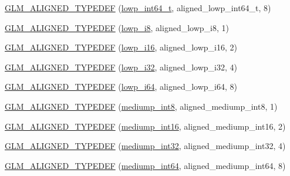\begin{DoxyCompactItemize}
\item 
\hyperlink{group__gtx__type__aligned_ga7ccb60f3215d293fd62b33b31ed0e7be}{G\+L\+M\+\_\+\+A\+L\+I\+G\+N\+E\+D\+\_\+\+T\+Y\+P\+E\+D\+E\+F} (\hyperlink{group__gtc__type__precision_ga14d72e76d57c7f28eca8e933816c9fd6}{lowp\+\_\+int64\+\_\+t}, aligned\+\_\+lowp\+\_\+int64\+\_\+t, 8)
\item 
\hyperlink{group__gtx__type__aligned_gac20d508d2ef5cc95ad3daf083c57ec2a}{G\+L\+M\+\_\+\+A\+L\+I\+G\+N\+E\+D\+\_\+\+T\+Y\+P\+E\+D\+E\+F} (\hyperlink{group__gtc__type__precision_gaa2e13ee29c90f75658beed6082541097}{lowp\+\_\+i8}, aligned\+\_\+lowp\+\_\+i8, 1)
\item 
\hyperlink{group__gtx__type__aligned_ga50257b48069a31d0c8d9c1f644d267de}{G\+L\+M\+\_\+\+A\+L\+I\+G\+N\+E\+D\+\_\+\+T\+Y\+P\+E\+D\+E\+F} (\hyperlink{group__gtc__type__precision_gaf7bbfd31bcec25a416ea94d09efb5451}{lowp\+\_\+i16}, aligned\+\_\+lowp\+\_\+i16, 2)
\item 
\hyperlink{group__gtx__type__aligned_gaa07e98e67b7a3435c0746018c7a2a839}{G\+L\+M\+\_\+\+A\+L\+I\+G\+N\+E\+D\+\_\+\+T\+Y\+P\+E\+D\+E\+F} (\hyperlink{group__gtc__type__precision_ga70fd34e8b8cffc92739161284ed77328}{lowp\+\_\+i32}, aligned\+\_\+lowp\+\_\+i32, 4)
\item 
\hyperlink{group__gtx__type__aligned_ga62601fc6f8ca298b77285bedf03faffd}{G\+L\+M\+\_\+\+A\+L\+I\+G\+N\+E\+D\+\_\+\+T\+Y\+P\+E\+D\+E\+F} (\hyperlink{group__gtc__type__precision_ga1f4ded25f71c0f3b4518936d50b54b6e}{lowp\+\_\+i64}, aligned\+\_\+lowp\+\_\+i64, 8)
\item 
\hyperlink{group__gtx__type__aligned_gac8cff825951aeb54dd846037113c72db}{G\+L\+M\+\_\+\+A\+L\+I\+G\+N\+E\+D\+\_\+\+T\+Y\+P\+E\+D\+E\+F} (\hyperlink{group__gtc__type__precision_ga3ee8faab2278c44c5785af04b7b18a14}{mediump\+\_\+int8}, aligned\+\_\+mediump\+\_\+int8, 1)
\item 
\hyperlink{group__gtx__type__aligned_ga78f443d88f438575a62b5df497cdf66b}{G\+L\+M\+\_\+\+A\+L\+I\+G\+N\+E\+D\+\_\+\+T\+Y\+P\+E\+D\+E\+F} (\hyperlink{group__gtc__type__precision_ga4611997edb6c61606daa11990cf08798}{mediump\+\_\+int16}, aligned\+\_\+mediump\+\_\+int16, 2)
\item 
\hyperlink{group__gtx__type__aligned_ga0680cd3b5d4e8006985fb41a4f9b57af}{G\+L\+M\+\_\+\+A\+L\+I\+G\+N\+E\+D\+\_\+\+T\+Y\+P\+E\+D\+E\+F} (\hyperlink{group__gtc__type__precision_ga0660a752402702f420f13c686a7fff29}{mediump\+\_\+int32}, aligned\+\_\+mediump\+\_\+int32, 4)
\item 
\hyperlink{group__gtx__type__aligned_gad9e5babb1dd3e3531b42c37bf25dd951}{G\+L\+M\+\_\+\+A\+L\+I\+G\+N\+E\+D\+\_\+\+T\+Y\+P\+E\+D\+E\+F} (\hyperlink{group__gtc__type__precision_ga603c695fe5cd677d3f72a81343e19a74}{mediump\+\_\+int64}, aligned\+\_\+mediump\+\_\+int64, 8)

\end{DoxyCompactItemize}
